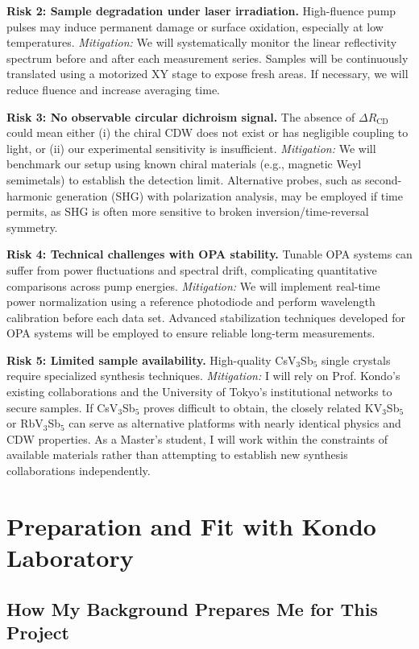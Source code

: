 \documentclass[12pt,a4paper]{article}
\begin{document}
\textbf{Risk 2: Sample degradation under laser irradiation.} High-fluence pump pulses may induce permanent damage or surface oxidation, especially at low temperatures. \textit{Mitigation:} We will systematically monitor the linear reflectivity spectrum before and after each measurement series. Samples will be continuously translated using a motorized XY stage to expose fresh areas. If necessary, we will reduce fluence and increase averaging time.

\textbf{Risk 3: No observable circular dichroism signal.} The absence of $\Delta R_{\text{CD}}$ could mean either (i) the chiral CDW does not exist or has negligible coupling to light, or (ii) our experimental sensitivity is insufficient. \textit{Mitigation:} We will benchmark our setup using known chiral materials (e.g., magnetic Weyl semimetals) to establish the detection limit. Alternative probes, such as second-harmonic generation (SHG) with polarization analysis, may be employed if time permits, as SHG is often more sensitive to broken inversion/time-reversal symmetry.

\textbf{Risk 4: Technical challenges with OPA stability.} Tunable OPA systems can suffer from power fluctuations and spectral drift, complicating quantitative comparisons across pump energies. \textit{Mitigation:} We will implement real-time power normalization using a reference photodiode and perform wavelength calibration before each data set. Advanced stabilization techniques developed for OPA systems will be employed to ensure reliable long-term measurements.

\textbf{Risk 5: Limited sample availability.} High-quality CsV$_3$Sb$_5$ single crystals require specialized synthesis techniques. \textit{Mitigation:} I will rely on Prof. Kondo's existing collaborations and the University of Tokyo's institutional networks to secure samples. If CsV$_3$Sb$_5$ proves difficult to obtain, the closely related KV$_3$Sb$_5$ or RbV$_3$Sb$_5$ can serve as alternative platforms with nearly identical physics and CDW properties. As a Master's student, I will work within the constraints of available materials rather than attempting to establish new synthesis collaborations independently.

\section{Preparation and Fit with Kondo Laboratory}

\subsection{How My Background Prepares Me for This Project}
\end{document}
